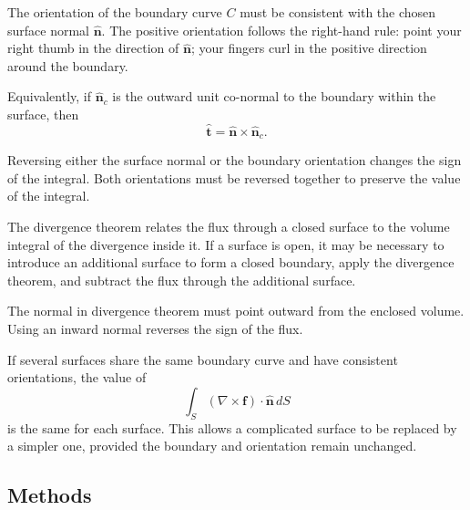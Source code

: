 \begin{mistake}
The orientation of the boundary curve \(C\) must be consistent with the chosen surface normal \(\hat{\boldsymbol n}\). The positive orientation follows the right-hand rule: point your right thumb in the direction of \(\hat{\boldsymbol n}\); your fingers curl in the positive direction around the boundary.

Equivalently, if \(\hat{\boldsymbol n}_c\) is the outward unit co-normal to the boundary within the surface, then
\[
\boxed{
\hat{\boldsymbol t}
=
\hat{\boldsymbol n}\times\hat{\boldsymbol n}_c.
}
\]

Reversing either the surface normal or the boundary orientation changes the sign of the integral. Both orientations must be reversed together to preserve the value of the integral.
\end{mistake}

\begin{mistake}
The divergence theorem relates the flux through a closed surface to the volume integral of the divergence inside it. If a surface is open, it may be necessary to introduce an additional surface to form a closed boundary, apply the divergence theorem, and subtract the flux through the additional surface.

\end{mistake}

\begin{mistake}
  The normal in divergence theorem must point outward from the enclosed volume. Using an inward normal reverses the sign of the flux.
\end{mistake}

\begin{mistake}
If several surfaces share the same boundary curve and have consistent orientations, the value of
\[
\int_S(\nabla\times\boldsymbol f)\cdot\hat{\boldsymbol n}\,dS
\]
is the same for each surface. This allows a complicated surface to be replaced by a simpler one, provided the boundary and orientation remain unchanged.
\end{mistake}


\subsection{Methods}

